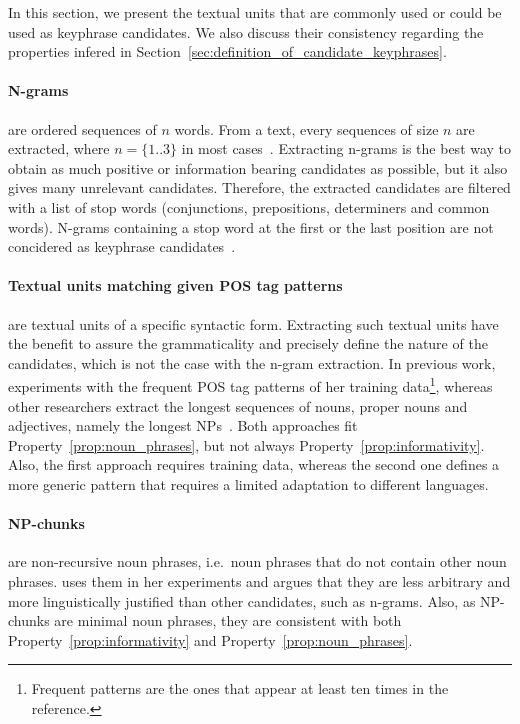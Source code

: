   In this section, we present the textual units that are commonly used or could
  be used as keyphrase candidates. We also discuss their consistency regarding
  the properties infered in
  Section~\ref{sec:definition_of_candidate_keyphrases}.

  \paragraph{N-grams} are ordered sequences of $n$ words. From a text, every
  sequences of size $n$ are extracted, where $n = \{1..3\}$ in most
  cases~\cite{witten1999kea,turney1999learningalgorithms,hulth2003keywordextraction}.
  Extracting n-grams is the best way to obtain as much positive or information
  bearing candidates as possible, but it also gives many unrelevant candidates.
  Therefore, the extracted candidates are filtered with a list of stop words
  (conjunctions, prepositions, determiners  and common words). N-grams
  containing a stop word at the first or the last position are not concidered as
  keyphrase candidates~\cite{witten1999kea}.

  \paragraph{Textual units matching given POS tag patterns} are textual units of
  a specific syntactic form. Extracting such textual units have the benefit to
  assure the grammaticality and precisely define the nature of the candidates,
  which is not the case with the n-gram extraction. In previous work,
   experiments with the frequent POS tag
  patterns of her training data\footnote{Frequent patterns are the ones that
  appear at least ten times in the reference.}, whereas other researchers
  extract the longest sequences of nouns, proper nouns and adjectives, namely
  the longest NPs~\cite{wan2008expandrank,hassan2010conundrums}. Both approaches
  fit Property~\ref{prop:noun_phrases}, but not always
  Property~\ref{prop:informativity}. Also, the first approach requires training
  data, whereas the second one defines a more generic pattern that requires a
  limited adaptation to different languages.

  \paragraph{NP-chunks} are non-recursive noun phrases, i.e.~noun phrases that
  do not contain other noun phrases.  uses
  them in her experiments and argues that they are less arbitrary and more
  linguistically justified than other candidates, such as n-grams. Also, as
  NP-chunks are minimal noun phrases, they are consistent with both
  Property~\ref{prop:informativity} and Property~\ref{prop:noun_phrases}.

